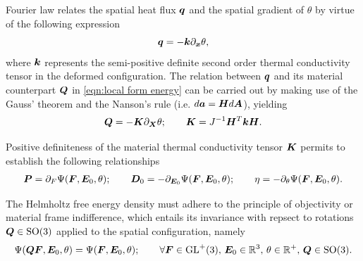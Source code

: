 Fourier law relates the spatial heat flux $\boldsymbol{q}$ and the spatial gradient of $\theta$ by virtue of the following expression
%
\begin{equation}\label{eqn:Duhamel}
\boldsymbol{q} = -\boldsymbol{k}\partial_{\boldsymbol{x}}\theta,
\end{equation}
%
where $\boldsymbol{k}$ represents the semi-positive definite second order thermal conductivity tensor in the deformed configuration. The relation between $\boldsymbol{q}$ and its material counterpart $\boldsymbol{Q}$ in \eqref{eqn:local form energy} can be carried out by making use of the Gauss' theorem and the Nanson's rule (i.e. $d\boldsymbol{a}=\boldsymbol{H}d\boldsymbol{A}$), yielding \cite{XXX}
%
\begin{equation}
\boldsymbol{Q} = -\boldsymbol{K}\partial_{\boldsymbol{X}}\theta;\qquad
\boldsymbol{K} = J^{-1}\boldsymbol{H}^T\boldsymbol{k}\boldsymbol{H}.
\end{equation}

Positive definiteness of the material thermal conductivity tensor $\boldsymbol{K}$ permits to establish \cite{Gonzalez_book, Gurtin} the following relationships
%
\begin{equation}\label{eqn:first derivatives Hewlmholtz}
\begin{aligned}
\boldsymbol{P} = \partial_{F}\Psi(\boldsymbol{F},\boldsymbol{E}_0,\theta);\qquad  \boldsymbol{D}_0 = -\partial_{\boldsymbol{E}_0}\Psi(\boldsymbol{F},\boldsymbol{E}_0,\theta);\qquad  \eta = -\partial_{\theta}\Psi(\boldsymbol{F},\boldsymbol{E}_0,\theta).
\end{aligned}	
\end{equation}

The Helmholtz free energy density must adhere to the principle of objectivity or material frame indifference, which entails its invariance with repsect to rotations $\boldsymbol{Q}\in \text{SO}(3)$ applied to the spatial configuration, namely
%
\begin{equation}\label{eqn:frame indifference}
	\Psi(\boldsymbol{Q}\boldsymbol{F}, \boldsymbol{E}_0, \theta) = \Psi(\boldsymbol{F},\boldsymbol{E}_0, \theta);\qquad \forall \boldsymbol{F}\in \text{GL}^{+}(3),\, \boldsymbol{E}_0 \in \mathbb{R}^3,\, \theta \in \mathbb{R}^{+}, \,\boldsymbol{Q}\in \text{SO}(3).
\end{equation}

